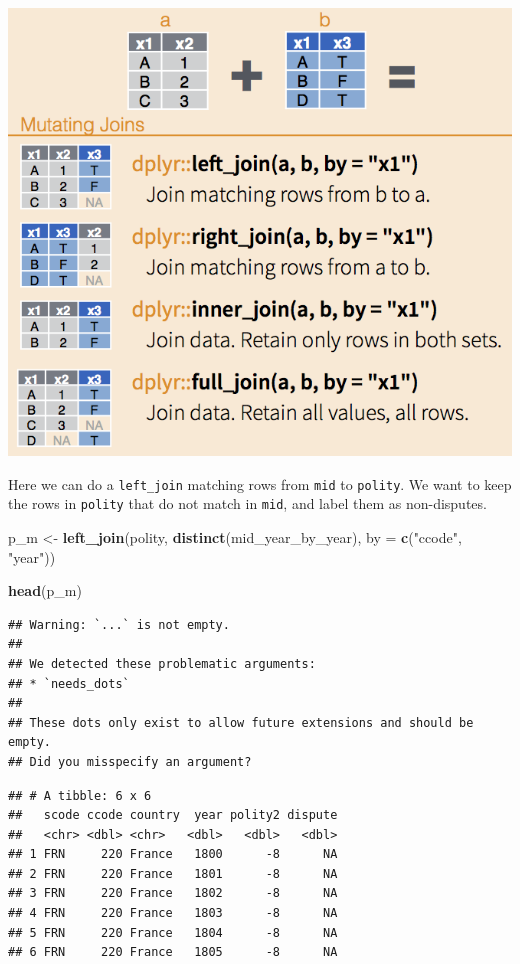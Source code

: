 \documentclass[
]{book}
\newenvironment{Shaded}{\begin{snugshade}}{\end{snugshade}}
\newcommand{\DataTypeTok}[1]{\textcolor[rgb]{0.13,0.29,0.53}{#1}}
\newcommand{\KeywordTok}[1]{\textcolor[rgb]{0.13,0.29,0.53}{\textbf{#1}}}
\newcommand{\NormalTok}[1]{#1}
\newcommand{\StringTok}[1]{\textcolor[rgb]{0.31,0.60,0.02}{#1}}
\theoremstyle{definition}
\theoremstyle{definition}
\theoremstyle{definition}
\theoremstyle{definition}
\theoremstyle{remark}
\begin{document}
\includegraphics{images/dplyr-joins.png}

Here we can do a \texttt{left\_join} matching rows from \texttt{mid} to \texttt{polity}. We want to keep the rows in \texttt{polity} that do not match in \texttt{mid}, and label them as non-disputes.

\begin{Shaded}
\begin{Highlighting}[]
\NormalTok{p_m <-}\StringTok{ }\KeywordTok{left_join}\NormalTok{(polity,}
                 \KeywordTok{distinct}\NormalTok{(mid_year_by_year),}
                 \DataTypeTok{by =} \KeywordTok{c}\NormalTok{(}\StringTok{"ccode"}\NormalTok{, }\StringTok{"year"}\NormalTok{))}

\KeywordTok{head}\NormalTok{(p_m)}
\end{Highlighting}
\end{Shaded}

\begin{verbatim}
## Warning: `...` is not empty.
## 
## We detected these problematic arguments:
## * `needs_dots`
## 
## These dots only exist to allow future extensions and should be empty.
## Did you misspecify an argument?
\end{verbatim}

\begin{verbatim}
## # A tibble: 6 x 6
##   scode ccode country  year polity2 dispute
##   <chr> <dbl> <chr>   <dbl>   <dbl>   <dbl>
## 1 FRN     220 France   1800      -8      NA
## 2 FRN     220 France   1801      -8      NA
## 3 FRN     220 France   1802      -8      NA
## 4 FRN     220 France   1803      -8      NA
## 5 FRN     220 France   1804      -8      NA
## 6 FRN     220 France   1805      -8      NA
\end{verbatim}
\end{document}
